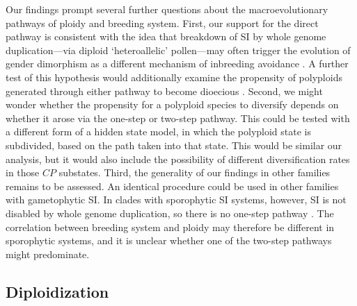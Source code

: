 Our findings prompt several further questions about the macroevolutionary pathways of ploidy and breeding system.
%
First, our support for the direct pathway is consistent with the idea that breakdown of SI by whole genome duplication---via diploid `heteroallelic' pollen---may often trigger the evolution of gender dimorphism as a different mechanism of inbreeding avoidance \citep{miller_2000}.
A further test of this hypothesis would additionally examine the propensity of polyploids generated through either pathway to become dioecious \citep{robertson_2011}.
%
Second, we might wonder whether the propensity for a polyploid species to diversify depends on whether it arose via the one-step or two-step pathway.
This could be tested with a different form of a hidden state model, in which the polyploid state is subdivided, based on the path taken into that state.
This would be similar our analysis, but it would also include the possibility of different diversification rates in those $CP$ substates.
%
Third, the generality of our findings in other families remains to be assessed.
An identical procedure could be used in other families with gametophytic SI.
In clades with sporophytic SI systems, however, SI is not disabled by whole genome duplication, so there is no one-step pathway \citep{miller_2000,mable_2004}.
The correlation between breeding system and ploidy may therefore be different in sporophytic systems, and it is unclear whether one of the two-step pathways might predominate.


\subsection*{Diploidization}

